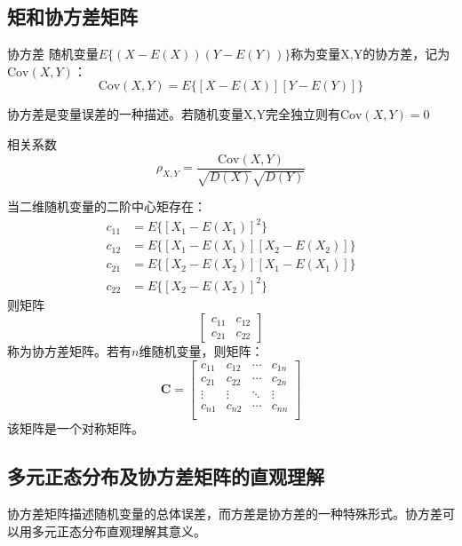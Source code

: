 \subsection{矩和协方差矩阵}
\begin{definition}{协方差}
    随机变量$E\{ (X-E(X))(Y-E(Y)) \}$称为变量X,Y的协方差，记为$\mathrm{Cov}(X,Y)$：
    \begin{equation}
        \mathrm{Cov}(X,Y)=E\{[X-E(X)][Y-E(Y)]\}
    \end{equation}
\end{definition}
\setlength{\parindent}{2em} 协方差是变量误差的一种描述。若随机变量X,Y完全独立则有$\mathrm{Cov}(X,Y)=0$
\begin{definition}{相关系数}
    \begin{equation}
        \rho_{X,Y}=\frac{\mathrm{Cov}(X,Y)}{\sqrt{D(X)}\sqrt{D(Y)}}
    \end{equation}
\end{definition}
当二维随机变量的二阶中心矩存在：
\begin{equation}
    \begin{aligned}
        c_{11}&=E\{[ X_1-E(X_1) ]^2\}\\
        c_{12}&=E\{[ X_1-E(X_1) ][ X_2-E(X_2) ]\}\\
        c_{21}&=E\{[ X_2-E(X_2) ][ X_1-E(X_1) ]\}\\
        c_{22}&=E\{[ X_2-E(X_2) ]^2\}
    \end{aligned}
\end{equation}
则矩阵$$ \left[\begin{matrix}
    c_{11}&c_{12}\\
    c_{21}&c_{22}
\end{matrix}\right] $$
称为协方差矩阵。若有$n$维随机变量，则矩阵：
\begin{equation}
    \mathbf{C}=\left[
    \begin{matrix}
        c_{11} & c_{12} & \cdots & c_{1n}\\
        c_{21} & c_{22} & \cdots & c_{2n}\\
        \vdots & \vdots & \ddots & \vdots\\
        c_{n1} & c_{n2} & \cdots & c_{nn}\\
    \end{matrix}
    \right]
\end{equation}
该矩阵是一个对称矩阵。
\subsection{多元正态分布及协方差矩阵的直观理解}
协方差矩阵描述随机变量的总体误差，而方差是协方差的一种特殊形式。协方差可以用多元正态分布直观理解其意义。
